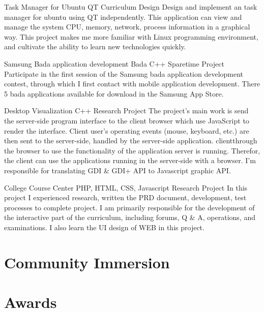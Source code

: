 \documentclass[11pt,a4paper]{moderncv}
\begin{document}
\vspace*{0.2\baselineskip}
{Task Manager for Ubuntu}
{QT}
{Curriculum Design}{}
{
Design and implement an task manager for ubuntu using QT independently. This application can view and manage
the system CPU, memory, network, process information  in a graphical way. This project makes me more familiar
with Linux programming environment, and cultivate the ability to learn new technologies quickly.
}

\vspace*{0.2\baselineskip}
{Samsung Bada application development}
{Bada C++}
{Sparetime Project}{}
{Participate in the first session of the Samsung bada application development contest, through which I first contact with mobile
application development. There 5 bada applications available for download in the Samsung App Store.
}

\vspace*{0.2\baselineskip}
{Desktop Visualization}
{C++}
{Research Project}{}
{The project's main work is send the server-side program interface to the client browser which use JavaScript to render the interface. 
Client user's operating events (mouse, keyboard, etc.) are then sent to the server-side, handled by the server-side application.
clientthrough the browser to use the functionality of the application server is running. Therefor, the client can use the
applications running in the server-side with a browser. I'm responsible for translating GDI \& GDI+ API to Javascript graphic API.
}

\vspace*{0.2\baselineskip}
{College Course Center}
{PHP, HTML, CSS, Javascript}
{Research Project}{}
{
In this project I experienced research, written the PRD document, development, test processes to complete project. 
I am primarily responsible for the development of the interactive part of the curriculum, including forums, Q \& A,
operations, and examinations. I also learn the UI design of WEB in this project.
}


\section{Community Immersion}

\section{Awards}
\end{document}
